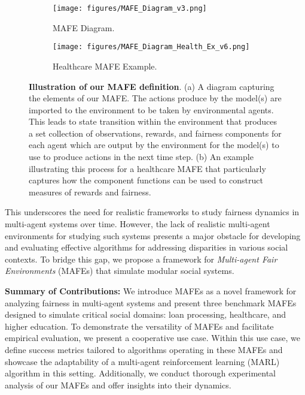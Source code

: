\begin{figure*}[ht!]
  \begin{subfigure}{0.34\textwidth}
    \texttt{[image: figures/MAFE\_Diagram\_v3.png]}
    \caption[MAFE Diagram]{ MAFE Diagram.} 
    \label{fig:MAFE_Diragram}
  \end{subfigure}%
  \hspace*{\fill}   %
  \begin{subfigure}{0.555\textwidth}
    \texttt{[image: figures/MAFE\_Diagram\_Health\_Ex\_v6.png]}
    \caption[Healthcare MAFE Example]{ Healthcare MAFE Example.}
    \label{fig:MAFE_Diagram_Health_Ex}
  \end{subfigure}%
\caption{\textbf{Illustration of our MAFE definition}. (a) A diagram capturing the elements of our MAFE. The actions produce by the model(s) are imported to the environment to be taken by environmental agents. This leads to state transition within the environment that produces a set collection of observations, rewards, and fairness components for each agent which are output by the environment for the model(s) to use to produce actions in the next time step. (b) An example illustrating this process for a healthcare MAFE that particularly captures how the component functions can be used to construct measures of rewards and fairness.} \label{fig:MAFE_diagram_overview}
\vspace{-3mm}
\end{figure*}

This underscores the need for realistic frameworks to study fairness dynamics in multi-agent systems over time. However, the lack of realistic multi-agent environments for studying such systems presents a major obstacle for developing and evaluating effective algorithms for addressing disparities in various social contexts. To bridge this gap, we propose a framework for \textit{Multi-agent Fair Environments} (MAFEs) that simulate modular social systems.

\textbf{Summary of Contributions:} We introduce MAFEs as a novel framework for analyzing fairness in multi-agent systems and present three benchmark MAFEs designed to simulate critical social domains: loan processing, healthcare, and higher education. To demonstrate the versatility of MAFEs and facilitate empirical evaluation, we present a cooperative use case. Within this use case, we define success metrics tailored to algorithms operating in these MAFEs and showcase the adaptability of a multi-agent reinforcement learning (MARL) algorithm in this setting. Additionally, we conduct thorough experimental analysis of our MAFEs and offer insights into their dynamics.
